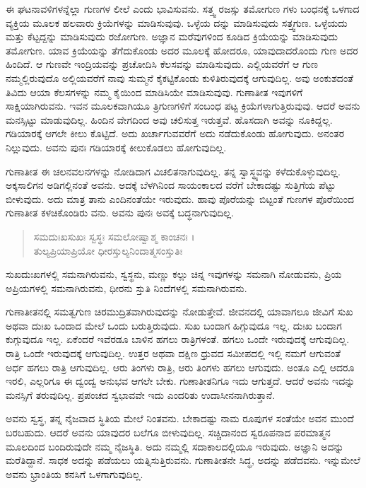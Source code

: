 ಈ ಘಟನಾವಳಿಗಳನ್ನೆಲ್ಲಾ ಗುಣಗಳ ಲೀಲೆ ಎಂದು ಭಾವಿಸುವನು. ಸತ್ತ್ವ ರಜಸ್ಸು ತಮೋಗುಣ ಗಳು ಬಂಧನಕ್ಕೆ ಒಳಗಾದ ವ್ಯಕ್ತಿಯ ಮೂಲಕ ಹಲವಾರು ಕ್ರಿಯೆಗಳನ್ನು ಮಾಡಿಸುವುವು. ಒಳ್ಳೆಯ ದನ್ನು ಮಾಡಿಸುವುದು ಸತ್ತ್ವಗುಣ. ಒಳ್ಳೆಯದು ಮತ್ತು ಕೆಟ್ಟದ್ದನ್ನು ಮಾಡಿಸುವುದು ರಜೋಗುಣ. ಅಜ್ಞಾನ ಮರೆವುಗಳಿಂದ ಕೂಡಿದ ಕ್ರಿಯೆಯನ್ನು ಮಾಡಿಸುವುದು ತಮೋಗುಣ. ಯಾವ ಕ್ರಿಯೆಯನ್ನು ತೆಗೆದುಕೊಂಡು ಅದರ ಮೂಲಕ್ಕೆ ಹೋದರೂ, ಯಾವುದಾದರೊಂದು ಗುಣ ಅದರ ಹಿಂದಿದೆ. ಆ ಗುಣವೇ ಇಂದ್ರಿಯವನ್ನು ಪ್ರಚೋದಿಸಿ ಕೆಲಸವನ್ನು ಮಾಡಿಸುವುದು. ಎಲ್ಲಿಯವರೆಗೆ ಆ ಗುಣ ನಮ್ಮಲ್ಲಿರುವುದೊ ಅಲ್ಲಿಯವರೆಗೆ ನಾವು ಸುಮ್ಮನೆ ಕೈಕಟ್ಟಿಕೊಂಡು ಕುಳಿತಿರುವುದಕ್ಕೆ ಆಗುವುದಿಲ್ಲ. ಅವು ಅಂಕುಶದಂತೆ ತಿವಿದು ಆಯಾ ಕೆಲಸಗಳನ್ನು ನಮ್ಮ ಕೈಯಿಂದ ಮಾಡಿಸಿಯೇ ಮಾಡಿಸುವುವು. ಗುಣಾತೀತ ಇವುಗಳಿಗೆ ಸಾಕ್ಷಿಯಾಗಿರುವನು. ಇವನ ಮೂಲಕವಾಗಿಯೂ ತ್ರಿಗುಣಗಳಿಗೆ ಸಂಬಂಧ ಪಟ್ಟ ಕ್ರಿಯೆಗಳಾಗುತ್ತಿರುವುವು. ಆದರೆ ಅವನು ಮನಸ್ಸಿಟ್ಟು ಮಾಡುವುದಿಲ್ಲ. ಹಿಂದಿನ ವೇಗದಿಂದ ಅವು ಚಲಿಸುತ್ತ ಇರುತ್ತವೆ. ಹೊಸದಾಗಿ ಅವನ್ನು ನೂಕಿದ್ದಲ್ಲ. ಗಡಿಯಾರಕ್ಕೆ ಆಗಲೇ ಕೀಲು ಕೊಟ್ಟಿದೆ. ಅದು ಖರ್ಚಾಗುವವರೆಗೆ ಅದು ನಡೆದುಕೊಂಡು ಹೋಗುವುದು. ಅನಂತರ ನಿಲ್ಲುವುದು. ಅವನು ಪುನಃ ಗಡಿಯಾರಕ್ಕೆ ಕೀಲುಕೊಡಲು ಹೋಗುವುದಿಲ್ಲ.

ಗುಣಾತೀತ ಈ ಚಲನವಲನಗಳನ್ನು ನೋಡಿದಾಗ ವಿಚಲಿತನಾಗುವುದಿಲ್ಲ. ತನ್ನ ಸ್ವಾಸ್ಥ್ಯವನ್ನು ಕಳೆದುಕೊಳ್ಳುವುದಿಲ್ಲ. ಅಕ್ಕಸಾಲಿಗನ ಅಡಿಗಲ್ಲಿನಂತೆ ಅವನು. ಅದಕ್ಕೆ ಬೆಳಗಿನಿಂದ ಸಾಯಂಕಾಲದ ವರೆಗೆ ಬೇಕಾದಷ್ಟು ಸುತ್ತಿಗೆಯ ಪೆಟ್ಟು ಬೀಳುವುದು. ಅದು ಮಾತ್ರ ತಾನು ಎಂದಿನಂತೆಯೇ ಇರುವುದು. ಹಾವು ಪೊರೆಯನ್ನು ಬಿಟ್ಟಂತೆ ಗುಣಗಳ ಪೊರೆಯಿಂದ ಗುಣಾತೀತ ಕಳಚಿಕೊಂಡಿರು ವನು. ಅವನು ಪುನಃ ಅವಕ್ಕೆ ಬದ್ಧನಾಗುವುದಿಲ್ಲ.

\begin{verse}
ಸಮದುಃಖಸುಖಃ ಸ್ವಸ್ಥಃ ಸಮಲೋಷ್ವಾಶ್ಮ ಕಾಂಚನಃ ।\\ತುಲ್ಯಪ್ರಿಯಾಪ್ರಿಯೋ ಧೀರಸ್ತುಲ್ಯನಿಂದಾತ್ಮಸಂಸ್ತುತಿಃ 
\end{verse}

{\small ಸುಖದುಃಖಗಳಲ್ಲಿ ಸಮನಾಗಿರುವನು, ಸ್ವಸ್ಥನು, ಮಣ್ಣು ಕಲ್ಲು ಚಿನ್ನ ಇವುಗಳನ್ನು ಸಮನಾಗಿ ನೋಡುವನು, ಪ್ರಿಯ ಅಪ್ರಿಯಗಳಲ್ಲಿ ಸಮನಾಗಿರುವನು, ಧೀರನು ಸ್ತುತಿ ನಿಂದೆಗಳಲ್ಲಿ ಸಮನಾಗಿರುವನು.}

ಗುಣಾತೀತನಲ್ಲಿ ಸಮತ್ವಗುಣ ಚಿರಮುದ್ರಿತವಾಗಿರುವುದನ್ನು ನೋಡುತ್ತೇವೆ. ಜೀವನದಲ್ಲಿ ಯಾವಾಗಲೂ ಜೀವಿಗೆ ಸುಖ ಅಥವಾ ದುಃಖ ಒಂದಾದ ಮೇಲೆ ಒಂದು ಬರುತ್ತಿರುವುದು. ಸುಖ ಬಂದಾಗ ಹಿಗ್ಗುವುದೂ ಇಲ್ಲ. ದುಃಖ ಬಂದಾಗ ಕುಗ್ಗುವುದೂ ಇಲ್ಲ. ಏಕೆಂದರೆ ಇವೆರಡೂ ಬಾಳಿನ ಹಗಲು ರಾತ್ರಿಗಳಂತೆ. ಹಗಲು ಒಂದೇ ಇರುವುದಕ್ಕೆ ಆಗುವುದಿಲ್ಲ. ರಾತ್ರಿ ಒಂದೇ ಇರುವುದಕ್ಕೆ ಆಗುವುದಿಲ್ಲ. ಉತ್ತರ ಅಥವಾ ದಕ್ಷಿಣ ಧ್ರುವದ ಸಮೀಪದಲ್ಲಿ ಇಲ್ಲಿ ನಮಗೆ ಆಗುವಂತೆ ಅರ್ಧ ಹಗಲು ರಾತ್ರಿ ಆಗುವುದಿಲ್ಲ. ಆರು ತಿಂಗಳು ರಾತ್ರಿ, ಆರು ತಿಂಗಳು ಹಗಲು ಆಗುವುದು. ಅಂತೂ ಎಲ್ಲಿ ಆದರೂ ಇರಲಿ, ಎಲ್ಲರಿಗೂ ಈ ದ್ವಂದ್ವ ಅನುಭವ ಆಗಲೇ ಬೇಕು. ಗುಣಾತೀತನಿಗೂ ಇದು ಆಗುತ್ತದೆ. ಆದರೆ ಅವನು ಇದನ್ನು ಮನಸ್ಸಿಗೆ ತರುವುದಿಲ್ಲ. ಪ್ರಪಂಚದ ಸ್ವಭಾವವೇ ಇದು ಎಂದರಿತು ಉದಾಸೀನನಾಗಿರುತ್ತಾನೆ.

ಅವನು ಸ್ವಸ್ಥ, ತನ್ನ ನೈಜವಾದ ಸ್ಥಿತಿಯ ಮೇಲೆ ನಿಂತವನು. ಬೇಕಾದಷ್ಟು ನಾಮ ರೂಪುಗಳ ಸಂತೆಯೇ ಅವನ ಮುಂದೆ ಬರಬಹುದು. ಆದರೆ ಅವನು ಯಾವುದರ ಬಲೆಗೂ ಬೀಳುವುದಿಲ್ಲ. ಸಚ್ಚಿದಾನಂದ ಸ್ವರೂಪನಾದ ಪರಮಾತ್ಮನ ಮೂಲದಿಂದ ಬಂದಿರುವುದೇ ನಮ್ಮ ನೈಜಸ್ಥಿತಿ. ಅದು ನಮ್ಮಲ್ಲಿ ಸದಾಕಾಲದಲ್ಲಿಯೂ ಇರುವುದು. ಅಜ್ಞಾನಿ ಅದನ್ನು ಮರೆತಿದ್ದಾನೆ. ಸಾಧಕ ಅದನ್ನು ಪಡೆಯಲು ಯತ್ನಿಸುತ್ತಿರುವನು. ಗುಣಾತೀತನೇ ಸಿದ್ಧ, ಅದನ್ನು ಪಡೆದವನು. ಇನ್ನುಮೇಲೆ ಅವನು ಭ್ರಾಂತಿಯ ಕನಸಿಗೆ ಒಳಗಾಗುವುದಿಲ್ಲ.

